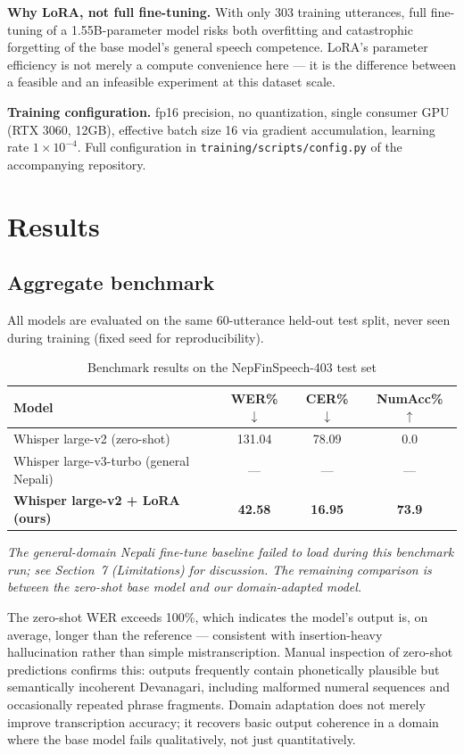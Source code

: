 \documentclass[11pt,a4paper]{article}
\begin{document}
\textbf{Why LoRA, not full fine-tuning.} With only 303 training utterances,
full fine-tuning of a 1.55B-parameter model risks both overfitting and
catastrophic forgetting of the base model's general speech competence.
LoRA's parameter efficiency is not merely a compute convenience here --- it
is the difference between a feasible and an infeasible experiment at this
dataset scale.

\textbf{Training configuration.} fp16 precision, no quantization, single
consumer GPU (RTX 3060, 12GB), effective batch size 16 via gradient
accumulation, learning rate $1\times10^{-4}$. Full configuration in
\texttt{training/scripts/config.py} of the accompanying repository.

\section{Results}

\subsection{Aggregate benchmark}

All models are evaluated on the same 60-utterance held-out test split,
never seen during training (fixed seed for reproducibility).

\begin{table}[H]
\centering
\caption{Benchmark results on the NepFinSpeech-403 test set}
\label{tab:results}
\begin{tabular}{lccc}
\toprule
\textbf{Model} & \textbf{WER\% $\downarrow$} & \textbf{CER\% $\downarrow$} & \textbf{NumAcc\% $\uparrow$} \\
\midrule
Whisper large-v2 (zero-shot) & 131.04 & 78.09 & 0.0 \\
Whisper large-v3-turbo (general Nepali) & --- & --- & --- \\
\textbf{Whisper large-v2 + LoRA (ours)} & \textbf{42.58} & \textbf{16.95} & \textbf{73.9} \\
\bottomrule
\end{tabular}
\end{table}

\textit{The general-domain Nepali fine-tune baseline failed to load during
this benchmark run; see Section~7 (Limitations) for discussion. The
remaining comparison is between the zero-shot base model and our
domain-adapted model.}

The zero-shot WER exceeds 100\%, which indicates the model's output is, on
average, longer than the reference --- consistent with insertion-heavy
hallucination rather than simple mistranscription. Manual inspection of
zero-shot predictions confirms this: outputs frequently contain
phonetically plausible but semantically incoherent Devanagari, including
malformed numeral sequences and occasionally repeated phrase fragments.
Domain adaptation does not merely improve transcription accuracy; it
recovers basic output coherence in a domain where the base model fails
qualitatively, not just quantitatively.
\end{document}

